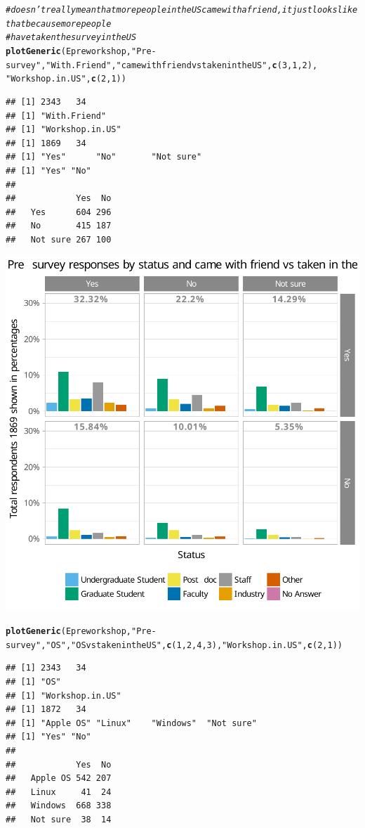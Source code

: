 \documentclass{article}\usepackage[]{graphicx}\usepackage[]{color}
\makeatletter
\newcommand{\hlnum}[1]{\textcolor[rgb]{0.686,0.059,0.569}{#1}}%
\newcommand{\hlstr}[1]{\textcolor[rgb]{0.192,0.494,0.8}{#1}}%
\newcommand{\hlcom}[1]{\textcolor[rgb]{0.678,0.584,0.686}{\textit{#1}}}%
\newcommand{\hlstd}[1]{\textcolor[rgb]{0.345,0.345,0.345}{#1}}%
\newcommand{\hlkwd}[1]{\textcolor[rgb]{0.737,0.353,0.396}{\textbf{#1}}}%
\newenvironment{kframe}{%
 \def\at@end@of@kframe{}%
 \ifinner\ifhmode%
  \def\at@end@of@kframe{\end{minipage}}%
  \begin{minipage}{\columnwidth}%
 \fi\fi%
 \def\FrameCommand##1{\hskip\@totalleftmargin \hskip-\fboxsep
 \colorbox{shadecolor}{##1}\hskip-\fboxsep
     \hskip-\linewidth \hskip-\@totalleftmargin \hskip\columnwidth}%
 \MakeFramed {\advance\hsize-\width
   \@totalleftmargin\z@ \linewidth\hsize
   \@setminipage}}%
 {\par\unskip\endMakeFramed%
 \at@end@of@kframe}
\newenvironment{knitrout}{}{} %
\makeatother
\begin{document}
\begin{knitrout}
{}


\begin{kframe}\begin{alltt}
\hlcom{# doesn't really mean that more people in the US came with a friend, it just looks like that because more people}
\hlcom{# have taken the survey in the US}
\hlkwd{plotGeneric}\hlstd{(Epreworkshop,} \hlstr{"Pre-survey"}\hlstd{,}\hlstr{"With.Friend"} \hlstd{,} \hlstr{"came with friend vs taken in the US"}\hlstd{,} \hlkwd{c}\hlstd{(}\hlnum{3}\hlstd{,}\hlnum{1}\hlstd{,}\hlnum{2}\hlstd{),}
            \hlstr{"Workshop.in.US"} \hlstd{,} \hlkwd{c}\hlstd{(}\hlnum{2}\hlstd{,}\hlnum{1}\hlstd{))}
\end{alltt}
\begin{verbatim}
## [1] 2343   34
## [1] "With.Friend"
## [1] "Workshop.in.US"
## [1] 1869   34
## [1] "Yes"      "No"       "Not sure"
## [1] "Yes" "No" 
##           
##            Yes  No
##   Yes      604 296
##   No       415 187
##   Not sure 267 100
\end{verbatim}
\end{kframe}

{\centering \includegraphics[width=.6\linewidth]{figure/calls-Rnwplotting-presurvey-data-13} 

}


\begin{kframe}\begin{alltt}
\hlkwd{plotGeneric}\hlstd{(Epreworkshop,} \hlstr{"Pre-survey"}\hlstd{,} \hlstr{"OS"}\hlstd{,} \hlstr{"OS vs taken in the US"}\hlstd{,} \hlkwd{c}\hlstd{(}\hlnum{1}\hlstd{,}\hlnum{2}\hlstd{,}\hlnum{4}\hlstd{,}\hlnum{3}\hlstd{),} \hlstr{"Workshop.in.US"} \hlstd{,} \hlkwd{c}\hlstd{(}\hlnum{2}\hlstd{,}\hlnum{1}\hlstd{))}
\end{alltt}
\begin{verbatim}
## [1] 2343   34
## [1] "OS"
## [1] "Workshop.in.US"
## [1] 1872   34
## [1] "Apple OS" "Linux"    "Windows"  "Not sure"
## [1] "Yes" "No" 
##           
##            Yes  No
##   Apple OS 542 207
##   Linux     41  24
##   Windows  668 338
##   Not sure  38  14
\end{verbatim}
\end{kframe}


\end{knitrout}
\end{document}
